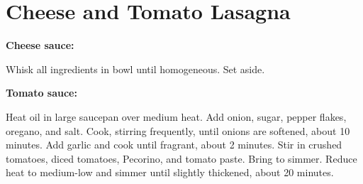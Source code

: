 \section{Cheese and Tomato Lasagna}
\begin{recipe}
	
	
	\textbf{Cheese sauce:}	
	

	Whisk all ingredients in bowl until homogeneous. Set aside.

	\textbf{Tomato sauce:}	
	
	
	Heat oil in large saucepan over medium heat. Add onion, sugar, pepper flakes, oregano, and salt. Cook, stirring frequently, until onions are softened, about 10 minutes. Add garlic and cook until fragrant, about 2 minutes. Stir in crushed tomatoes, diced tomatoes, Pecorino, and tomato paste. Bring to simmer. Reduce heat to medium-low and simmer until slightly thickened, about 20 minutes.
	

\end{recipe}
